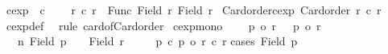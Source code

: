 \begin{isabellebody}
\ cexp\ {\isacharparenleft}{\kern0pt}\ {\isachardoublequoteopen}{\isacharcircum}{\kern0pt}c{\isachardoublequoteclose}\ {}{}{\isacharparenright}{\kern0pt}\ \isanewline
\ \ {\isachardoublequoteopen}r{}\ {\isacharcircum}{\kern0pt}c\ r{}\ {\isasymequiv}\ {\isacharbar}{\kern0pt}Func\ {\isacharparenleft}{\kern0pt}Field\ r{}{\isacharparenright}{\kern0pt}\ {\isacharparenleft}{\kern0pt}Field\ r{}{\isacharparenright}{\kern0pt}{\isacharbar}{\kern0pt}{\isachardoublequoteclose}\isanewline
\isanewline
{}\isamarkupfalse%
\ Card{\isacharunderscore}{\kern0pt}order{\isacharunderscore}{\kern0pt}cexp{\isacharcolon}{\kern0pt}\ {\isachardoublequoteopen}Card{\isacharunderscore}{\kern0pt}order\ {\isacharparenleft}{\kern0pt}r{}\ {\isacharcircum}{\kern0pt}c\ r{}{\isacharparenright}{\kern0pt}{\isachardoublequoteclose}\isanewline
%
\isadelimproof
%
\endisadelimproof
%
\isatagproof
{}\isamarkupfalse%
\ cexp{\isacharunderscore}{\kern0pt}def\ \isamarkupfalse%
\ {\isacharparenleft}{\kern0pt}rule\ card{\isacharunderscore}{\kern0pt}of{\isacharunderscore}{\kern0pt}Card{\isacharunderscore}{\kern0pt}order{\isacharparenright}{\kern0pt}%
\endisatagproof
{\isafoldproof}%
%
\isadelimproof
\isanewline
%
\endisadelimproof
\isanewline
{}\isamarkupfalse%
\ cexp{\isacharunderscore}{\kern0pt}mono{\isacharprime}{\kern0pt}{\isacharcolon}{\kern0pt}\isanewline
\ \ \ {}{\isacharcolon}{\kern0pt}\ {\isachardoublequoteopen}p{}\ {\isasymle}o\ r{}{\isachardoublequoteclose}\ \ {}{\isacharcolon}{\kern0pt}\ {\isachardoublequoteopen}p{}\ {\isasymle}o\ r{}{\isachardoublequoteclose}\isanewline
\ \ \ n{\isacharcolon}{\kern0pt}\ {\isachardoublequoteopen}Field\ p{}\ {\isacharequal}{\kern0pt}\ {\isacharbraceleft}{\kern0pt}{\isacharbraceright}{\kern0pt}\ {\isasymLongrightarrow}\ Field\ r{}\ {\isacharequal}{\kern0pt}\ {\isacharbraceleft}{\kern0pt}{\isacharbraceright}{\kern0pt}{\isachardoublequoteclose}\isanewline
\ \ \ {\isachardoublequoteopen}p{}\ {\isacharcircum}{\kern0pt}c\ p{}\ {\isasymle}o\ r{}\ {\isacharcircum}{\kern0pt}c\ r{}{\isachardoublequoteclose}\isanewline
%
\isadelimproof
%
\endisadelimproof
%
\isatagproof
{}\isamarkupfalse%
{\isacharparenleft}{\kern0pt}cases\ {\isachardoublequoteopen}Field\ p{}\ {\isacharequal}{\kern0pt}\ {\isacharbraceleft}{\kern0pt}{\isacharbraceright}{\kern0pt}{\isachardoublequoteclose}{\isacharparenright}{\kern0pt}\isanewline

\end{isabellebody}
